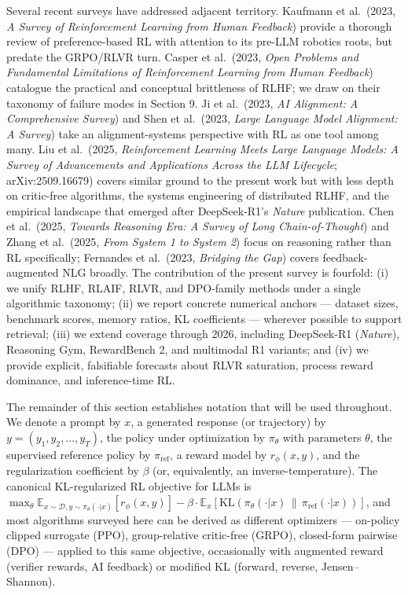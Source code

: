 Several recent surveys have addressed adjacent territory. Kaufmann et al.~(2023, \emph{A Survey of Reinforcement Learning from Human Feedback}) provide a thorough review of preference-based RL with attention to its pre-LLM robotics roots, but predate the GRPO/RLVR turn. Casper et al.~(2023, \emph{Open Problems and Fundamental Limitations of Reinforcement Learning from Human Feedback}) catalogue the practical and conceptual brittleness of RLHF; we draw on their taxonomy of failure modes in Section 9. Ji et al.~(2023, \emph{AI Alignment: A Comprehensive Survey}) and Shen et al.~(2023, \emph{Large Language Model Alignment: A Survey}) take an alignment-systems perspective with RL as one tool among many. Liu et al.~(2025, \emph{Reinforcement Learning Meets Large Language Models: A Survey of Advancements and Applications Across the LLM Lifecycle}; arXiv:2509.16679) covers similar ground to the present work but with less depth on critic-free algorithms, the systems engineering of distributed RLHF, and the empirical landscape that emerged after DeepSeek-R1's \emph{Nature} publication. Chen et al.~(2025, \emph{Towards Reasoning Era: A Survey of Long Chain-of-Thought}) and Zhang et al.~(2025, \emph{From System 1 to System 2}) focus on reasoning rather than RL specifically; Fernandes et al.~(2023, \emph{Bridging the Gap}) covers feedback-augmented NLG broadly. The contribution of the present survey is fourfold: (i) we unify RLHF, RLAIF, RLVR, and DPO-family methods under a single algorithmic taxonomy; (ii) we report concrete numerical anchors --- dataset sizes, benchmark scores, memory ratios, KL coefficients --- wherever possible to support retrieval; (iii) we extend coverage through 2026, including DeepSeek-R1 (\emph{Nature}), Reasoning Gym, RewardBench 2, and multimodal R1 variants; and (iv) we provide explicit, falsifiable forecasts about RLVR saturation, process reward dominance, and inference-time RL.

The remainder of this section establishes notation that will be used throughout. We denote a prompt by \(x\), a generated response (or trajectory) by \(y = (y_1, y_2, \ldots, y_T)\), the policy under optimization by \(\pi_\theta\) with parameters \(\theta\), the supervised reference policy by \(\pi_{\text{ref}}\), a reward model by \(r_\phi(x, y)\), and the regularization coefficient by \(\beta\) (or, equivalently, an inverse-temperature). The canonical KL-regularized RL objective for LLMs is \(\max_\theta \mathbb{E}_{x \sim \mathcal{D}, y \sim \pi_\theta(\cdot|x)} [r_\phi(x, y)] - \beta \cdot \mathbb{E}_{x} [\mathrm{KL}(\pi_\theta(\cdot|x) \,\|\, \pi_{\text{ref}}(\cdot|x))]\), and most algorithms surveyed here can be derived as different optimizers --- on-policy clipped surrogate (PPO), group-relative critic-free (GRPO), closed-form pairwise (DPO) --- applied to this same objective, occasionally with augmented reward (verifier rewards, AI feedback) or modified KL (forward, reverse, Jensen--Shannon).

